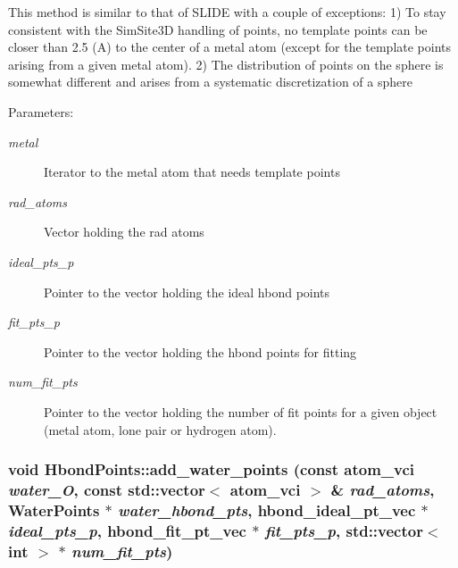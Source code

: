 This method is similar to that of SLIDE with a couple of exceptions: 1) To stay consistent with the SimSite3D handling of points, no template points can be closer than 2.5 (A) to the center of a metal atom (except for the template points arising from a given metal atom). 2) The distribution of points on the sphere is somewhat different and arises from a systematic discretization of a sphere

\begin{Desc}
\item[Parameters:]
\begin{description}
\item[{\em metal}]Iterator to the metal atom that needs template points \item[{\em rad\_\-atoms}]Vector holding the rad atoms \item[{\em ideal\_\-pts\_\-p}]Pointer to the vector holding the ideal hbond points \item[{\em fit\_\-pts\_\-p}]Pointer to the vector holding the hbond points for fitting \item[{\em num\_\-fit\_\-pts}]Pointer to the vector holding the number of fit points for a given object (metal atom, lone pair or hydrogen atom). \end{description}
\end{Desc}
\subsubsection{\setlength{\rightskip}{0pt plus 5cm}void Hbond\-Points::add\_\-water\_\-points (const atom\_\-vci {\em water\_\-O}, const std::vector$<$ atom\_\-vci $>$ \& {\em rad\_\-atoms}, \bf{Water\-Points} $\ast$ {\em water\_\-hbond\_\-pts}, \bf{hbond\_\-ideal\_\-pt\_\-vec} $\ast$ {\em ideal\_\-pts\_\-p}, \bf{hbond\_\-fit\_\-pt\_\-vec} $\ast$ {\em fit\_\-pts\_\-p}, std::vector$<$ int $>$ $\ast$ {\em num\_\-fit\_\-pts})\hspace{0.3cm}{\tt  [private]}}\label{classSimSite3D_1_1HbondPoints_94654be41f529fa7a22c08ff9f422e50}


